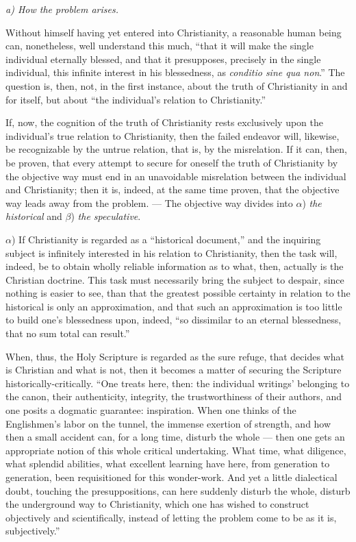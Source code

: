 \documentclass[12pt]{book}
\begin{document}
\begin{center}
\emph{a) How the problem arises.}
\end{center}

Without himself having yet entered into Christianity, a reasonable human being can, nonetheless, well understand this much, ``that it will make the single individual eternally blessed, and that it presupposes, precisely in the single individual, this infinite interest in his blessedness, as \textit{conditio sine qua non}.'' The question is, then, not, in the first instance, about the truth of Christianity in and for itself, but about ``the individual's relation to Christianity.''

If, now, the cognition of the truth of Christianity rests exclusively upon the individual's true relation to Christianity, then the failed endeavor will, likewise, be recognizable by the untrue relation, that is, by the misrelation. If it can, then, be proven, that every attempt to secure for oneself the truth of Christianity by the objective way must end in an unavoidable misrelation between the individual and Christianity; then it is, indeed, at the same time proven, that the objective way leads away from
the problem. --- The objective way divides into $\alpha$) \emph{the historical} and $\beta$) \emph{the speculative}.

$\alpha$) If Christianity is regarded as a ``historical document,'' and the inquiring subject is infinitely interested in his relation to Christianity, then the task will, indeed, be to obtain wholly reliable information as to what, then, actually is the Christian doctrine. This task must necessarily bring the subject to despair, since nothing is easier to see, than that the greatest possible certainty in relation to the historical is only an approximation, and that such an approximation is too little to build one's blessedness upon, indeed, ``so dissimilar to an eternal blessedness, that no sum total can result.''

When, thus, the Holy Scripture is regarded as the sure refuge, that decides what is Christian and what is not, then it becomes a matter of securing the Scripture historically-critically. ``One treats here, then: the individual writings' belonging to the canon, their authenticity, integrity, the trustworthiness of their authors, and one posits a dogmatic guarantee: inspiration. When one thinks of the Englishmen's labor on the tunnel, the immense exertion of strength, and how then a small accident can, for a long time, disturb the whole --- then one gets an appropriate notion of this whole critical undertaking. What time, what diligence, what splendid abilities, what excellent learning have here, from generation to generation, been requisitioned for this wonder-work. And yet a little dialectical doubt, touching the presuppositions, can here suddenly
disturb the whole, disturb the underground way to Christianity, which one has wished to construct objectively and scientifically, instead of letting the problem come to be as it is, subjectively.''
\end{document}
